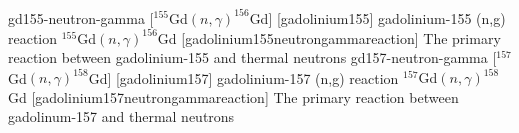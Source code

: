 \newglsXreaction%
{gd155-neutron-gamma}%
[{}$^{155}$Gd$(n,\gamma)^{156}$Gd]%
[gadolinium155]%
{gadolinium-155 (n,g) reaction}%
{{}$^{155}$Gd$(n,\gamma)^{156}$Gd}%
[gadolinium155neutrongammareaction]%
{The primary reaction between gadolinium-155 and thermal neutrons}%
\newglsXreaction%
{gd157-neutron-gamma}%
[{}$^{157}$Gd$(n,\gamma)^{158}$Gd]%
[gadolinium157]%
{gadolinium-157 (n,g) reaction}%
{{}$^{157}$Gd$(n,\gamma)^{158}$Gd}%
[gadolinium157neutrongammareaction]%
{The primary reaction between gadolinum-157 and thermal neutrons}%
